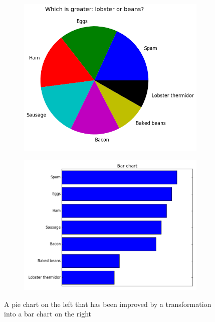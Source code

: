 \begin{figure}
\centering
\begin{subfigure}{.45\textwidth}
\centering
\includegraphics[width=\textwidth]{pie_chart_sorted.png}
\end{subfigure}
\begin{subfigure}{.45\textwidth}
\centering
\includegraphics[width=\textwidth]{bar_chart_horizontal_sorted.png}
\end{subfigure}
\caption{A pie chart on the left that has been improved by a transformation into a bar chart on the right}
\label{fig:pievsbar}
\end{figure}


